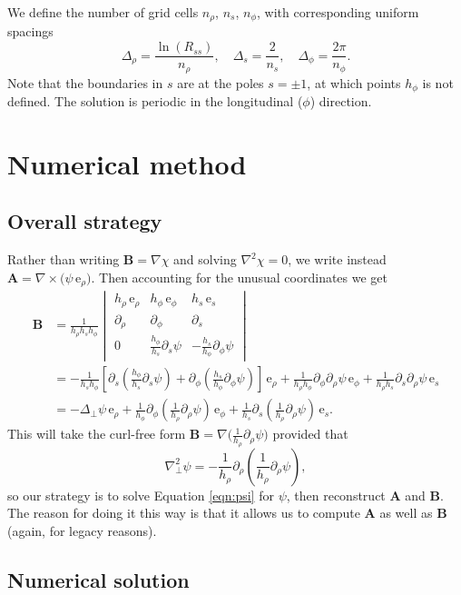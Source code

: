\documentclass[11pt]{article}
\newcommand{\dy}{\partial}
\newcommand{\dr}{\Delta_\rho}
\newcommand{\ds}{\Delta_s}
\newcommand{\dph}{\Delta_\phi}
\newcommand{\nr}{n_\rho}
\newcommand{\ns}{n_s}
\newcommand{\nph}{n_\phi}
\newcommand{\Ab}{\boldsymbol{A}}
\newcommand{\Bb}{\boldsymbol{B}}
\newcommand{\evr}{\,\mathrm{e}_\rho}
\newcommand{\evs}{\,\mathrm{e}_s}
\newcommand{\evp}{\,\mathrm{e}_\phi}
\begin{document}
We define the number of grid cells $\nr$, $\ns$, $\nph$, with corresponding uniform spacings
\[
\dr = \frac{\ln(R_{ss})}{\nr}, \quad \ds = \frac{2}{\ns}, \quad \dph = \frac{2\pi}{\nph}.
\]
Note that the boundaries in $s$ are at the poles $s=\pm1$, at which points $h_\phi$ is not defined. The solution is periodic in the longitudinal ($\phi$) direction.


\section{Numerical method}

\subsection{Overall strategy}

Rather than writing $\Bb = \nabla\chi$ and solving $\nabla^2\chi=0$, we write instead $\Ab = \nabla\times\big(\psi \evr\big)$. Then accounting for the unusual coordinates we get
\begin{align}
\Bb &=  \frac{1}{h_\rho h_sh_\phi}
\begin{vmatrix}
h_\rho\evr & h_\phi\evp & h_s\evs\\
\dy_\rho & \dy_\phi & \dy_s\\
0 & \frac{h_\phi}{h_s}\dy_s\psi & -\frac{h_s}{h_\phi}\dy_\phi\psi
\end{vmatrix}\\
&= -\frac{1}{h_sh_\phi}\left[\dy_s\left(\frac{h_\phi}{h_s}\dy_s\psi\right) + \dy_\phi\left(\frac{h_s}{h_\phi}\dy_\phi\psi\right) \right]\evr + \frac{1}{h_\rho h_\phi}\dy_\phi\dy_\rho\psi\evp + \frac{1}{h_\rho h_s}\dy_s\dy_\rho\psi\evs\\
&= -\Delta_\perp\psi\evr + \frac{1}{h_\phi}\dy_\phi\left(\frac{1}{h_\rho}\dy_\rho\psi\right)\evp + \frac{1}{h_s}\dy_s\left(\frac{1}{h_\rho}\dy_\rho\psi\right)\evs.
\end{align}
This will take the curl-free form $\Bb = \nabla\big(\tfrac1{h_\rho}\dy_\rho\psi\big)$ provided that
\begin{equation}
\nabla^2_\perp\psi = -\frac{1}{h_\rho}\dy_\rho\left(\frac{1}{h_\rho}\dy_\rho\psi\right),
\label{eqn:psi}
\end{equation}
so our strategy is to solve Equation \eqref{eqn:psi} for $\psi$, then reconstruct $\Ab$ and $\Bb$. The reason for doing it this way is that it allows us to compute $\Ab$ as well as $\Bb$ (again, for legacy reasons).

\subsection{Numerical solution}
\end{document}
